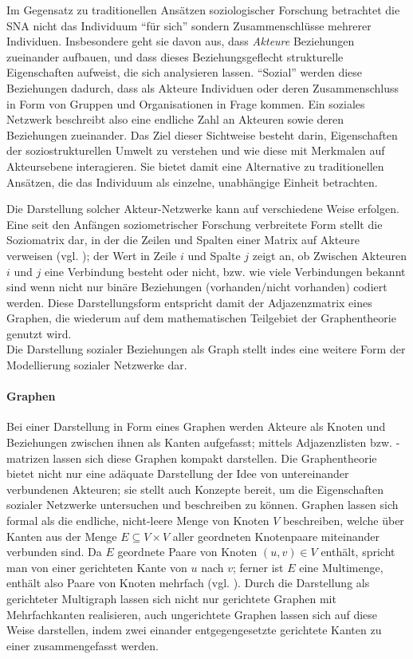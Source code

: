 \documentclass[11pt,a4paper,twoside]{article}
\let\oldpar\paragraph
\renewcommand{\paragraph}{\oldpar*}
\begin{document}
Im Gegensatz zu traditionellen Ansätzen soziologischer Forschung
betrachtet die SNA nicht das Individuum \enquote{für sich} sondern
Zusammenschlüsse mehrerer Individuen. Insbesondere geht sie davon aus,
dass \emph{Akteure} Beziehungen zueinander aufbauen, und dass dieses
Beziehungsgeflecht strukturelle Eigenschaften aufweist, die sich
analysieren lassen. \enquote{Sozial} werden diese Beziehungen dadurch,
dass als Akteure Individuen oder deren Zusammenschluss in Form von
Gruppen und Organisationen in Frage kommen. Ein soziales Netzwerk
beschreibt also eine endliche Zahl an Akteuren sowie deren Beziehungen
zueinander. Das Ziel dieser Sichtweise besteht darin, Eigenschaften der
soziostrukturellen Umwelt zu verstehen und wie diese mit Merkmalen auf
Akteursebene interagieren. Sie bietet damit eine Alternative zu
traditionellen Ansätzen, die das Individuum als einzelne, unabhängige
Einheit betrachten.

Die Darstellung solcher Akteur-Netzwerke kann auf verschiedene Weise
erfolgen. Eine seit den Anfängen soziometrischer Forschung verbreitete
Form stellt die Soziomatrix dar, in der die Zeilen und Spalten einer
Matrix auf Akteure verweisen (vgl. \autocite[S. 70]{Wasserman1994}); der
Wert in Zeile \(i\) und Spalte \(j\) zeigt an, ob Zwischen Akteuren
\(i\) und \(j\) eine Verbindung besteht oder nicht, bzw. wie viele
Verbindungen bekannt sind wenn nicht nur binäre Beziehungen
(vorhanden/nicht vorhanden) codiert werden. Diese Darstellungsform
entspricht damit der Adjazenzmatrix eines Graphen, die wiederum auf dem
mathematischen Teilgebiet der Graphentheorie genutzt wird.\\
Die Darstellung sozialer Beziehungen als Graph stellt indes eine weitere
Form der Modellierung sozialer Netzwerke dar.

\hypertarget{graphen}{%
\paragraph{Graphen}\label{graphen}}

Bei einer Darstellung in Form eines Graphen werden Akteure als Knoten
und Beziehungen zwischen ihnen als Kanten aufgefasst; mittels
Adjazenzlisten bzw. -matrizen lassen sich diese Graphen kompakt
darstellen. Die Graphentheorie bietet nicht nur eine adäquate
Darstellung der Idee von untereinander verbundenen Akteuren; sie stellt
auch Konzepte bereit, um die Eigenschaften sozialer Netzwerke
untersuchen und beschreiben zu können. Graphen lassen sich formal als
die endliche, nicht-leere Menge von Knoten \(V\) beschreiben, welche
über Kanten aus der Menge \(E \subseteq V \times V\) aller geordneten
Knotenpaare miteinander verbunden sind. Da \(E\) geordnete Paare von
Knoten \((u,v) \in V\) enthält, spricht man von einer gerichteten Kante
von \(u\) nach \(v\); ferner ist \(E\) eine Multimenge, enthält also
Paare von Knoten mehrfach (vgl. \autocite{Brandes2012}). Durch die
Darstellung als gerichteter Multigraph lassen sich nicht nur gerichtete
Graphen mit Mehrfachkanten realisieren, auch ungerichtete Graphen lassen
sich auf diese Weise darstellen, indem zwei einander entgegengesetzte
gerichtete Kanten zu einer zusammengefasst werden.
\end{document}
